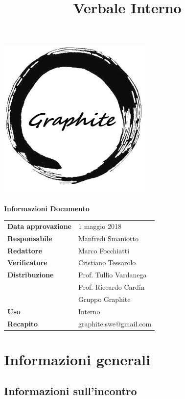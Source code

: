 \documentclass[openany,12pt,a4paper]{article}
\title{Verbale Interno}
\author{}
\begin{document}
	\makeatletter
	\begin{titlepage}
		\setlength{\headsep}{0pt}  
		\begin{center}
			\includegraphics[width=0.5\linewidth]{Logo.png}\\[1em]
			{\huge \bfseries  \@title }\\[10ex]
			\textbf{\Large Informazioni Documento} \\[2em]
			\bgroup
			\def\arraystretch{1.5}
			\begin{tabular}{l|l}
				\textbf{Data approvazione} & 1 maggio 2018 \\
				\textbf{Responsabile} & Manfredi Smaniotto \\
				\textbf{Redattore} & Marco Focchiatti \\
				\textbf{Verificatore} & Cristiano Tessarolo \\
				\textbf{Distribuzione} & Prof. Tullio Vardanega \\
				 & Prof. Riccardo Cardin \\
				 & Gruppo Graphite \\
				\textbf{Uso} & Interno \\
				\textbf{Recapito} & graphite.swe@gmail.com \\
			\end{tabular}
		\egroup
		\end{center}
	\end{titlepage}
	\makeatother

	\thispagestyle{empty}
	\newpage
	
	\tableofcontents
	\newpage
	
	\section{Informazioni generali}
	
	\subsection{Informazioni sull'incontro}
	
\end{document}
